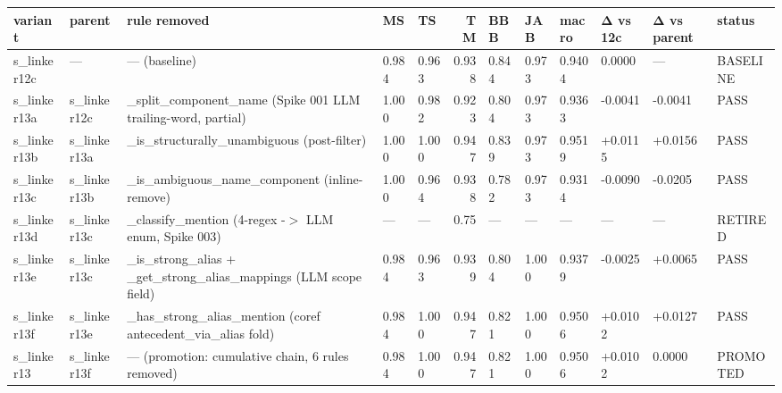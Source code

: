 \begin{tabular}{lllllrllllll}
\toprule
 variant     & parent      & rule removed                                                    & MS    & TS    &    TM & BBB   & JAB   & macro   & Δ vs 12c   & Δ vs parent   & status   \\
\midrule
 s\_linker12c & —           & — (baseline)                                                    & 0.984 & 0.963 & 0.938 & 0.844 & 0.973 & 0.9404  & 0.0000     & —             & BASELINE \\
 s\_linker13a & s\_linker12c & \_split\_component\_name (Spike 001 LLM trailing-word, partial)    & 1.000 & 0.982 & 0.923 & 0.804 & 0.973 & 0.9363  & -0.0041    & -0.0041       & PASS     \\
 s\_linker13b & s\_linker13a & \_is\_structurally\_unambiguous (post-filter)                      & 1.000 & 1.000 & 0.947 & 0.839 & 0.973 & 0.9519  & +0.0115    & +0.0156       & PASS     \\
 s\_linker13c & s\_linker13b & \_is\_ambiguous\_name\_component (inline-remove)                    & 1.000 & 0.964 & 0.938 & 0.782 & 0.973 & 0.9314  & -0.0090    & -0.0205       & PASS     \\
 s\_linker13d & s\_linker13c & \_classify\_mention (4-regex -\ensuremath{>} LLM enum, Spike 003)              & —     & —     & 0.75  & —     & —     & —       & —          & —             & RETIRED  \\
 s\_linker13e & s\_linker13c & \_is\_strong\_alias + \_get\_strong\_alias\_mappings (LLM scope field) & 0.984 & 0.963 & 0.939 & 0.804 & 1.000 & 0.9379  & -0.0025    & +0.0065       & PASS     \\
 s\_linker13f & s\_linker13e & \_has\_strong\_alias\_mention (coref antecedent\_via\_alias fold)     & 0.984 & 1.000 & 0.947 & 0.821 & 1.000 & 0.9506  & +0.0102    & +0.0127       & PASS     \\
 s\_linker13  & s\_linker13f & — (promotion: cumulative chain, 6 rules removed)                & 0.984 & 1.000 & 0.947 & 0.821 & 1.000 & 0.9506  & +0.0102    & 0.0000        & PROMOTED \\
\bottomrule
\end{tabular}

